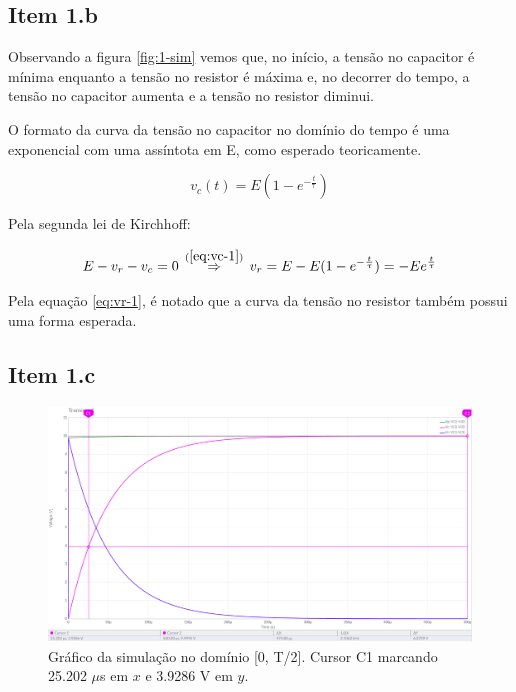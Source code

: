 \documentclass[11pt]{article}
\begin{document}
\subsection*{Item 1.b}

Observando a figura \ref{fig:1-sim} vemos que, no início, a tensão no capacitor é mínima enquanto a tensão no resistor é máxima e, no decorrer do tempo, a tensão no capacitor aumenta e a tensão no resistor diminui.

O formato da curva da tensão no capacitor no domínio do tempo é uma exponencial com uma assíntota em E, como esperado teoricamente.

\begin{equation}
  v_{c}(t) = E(1 - e^{-\frac{t}{\uptau}})
  \label{eq:vc-1}
\end{equation}

Pela segunda lei de Kirchhoff:

\begin{equation}
  E - v_{r} - v_{c} = 0 \, \overset{(\ref{eq:vc-1})}{\Rightarrow} \, v_{r} = E - E(1 - e^{-\frac{t}{\uptau}}) = -Ee^{\frac{t}{\uptau}}
  \label{eq:vr-1}
\end{equation}

Pela equação \ref{eq:vr-1}, é notado que a curva da tensão no resistor também possui uma forma esperada.

\subsection*{Item 1.c}

\begin{figure}[h!]
  \centering
  \includegraphics[width=\textwidth]{fig/1-c}
  \caption{Gráfico da simulação no domínio [0, T/2]. Cursor C1 marcando 25.202 $\mu$s em $x$ e 3.9286 V em $y$.}
\end{figure}
\end{document}
